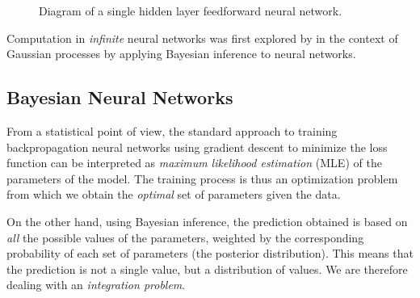 \begin{figure}[H]
    \caption{Diagram of a single hidden layer feedforward neural network.}%
    \label{fig:neural_network}
\end{figure}

Computation in \emph{infinite} neural networks was first explored by
\textcite{nealBayesianLearningNeural1996} in the context of Gaussian
processes by applying Bayesian inference to neural networks.

\subsection{Bayesian Neural Networks}%
\label{sub:bayesian_neural_networks}

From a statistical point of view, the standard approach to training
backpropagation neural networks using gradient descent to minimize the
loss function can be interpreted as
\emph{maximum likelihood estimation} (MLE) of the parameters of the model.
The training process is thus an optimization problem from which we obtain
the \emph{optimal} set of parameters given the data.

On the other hand, using Bayesian inference, the prediction obtained is based
on \emph{all} the possible values of the parameters, weighted by the corresponding
probability of each set of parameters (the posterior distribution). This means
that the prediction is not a single value, but a distribution of values. We are therefore
dealing with an \emph{integration problem}.


